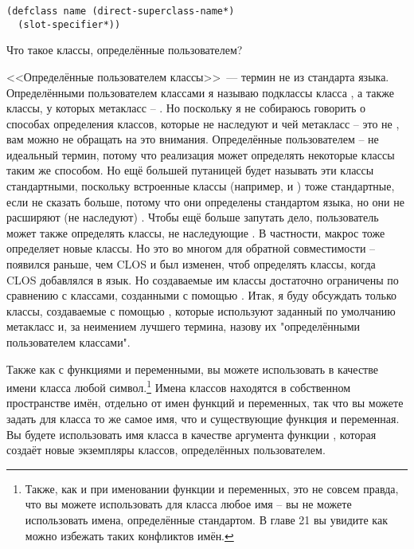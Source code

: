 \begin{lstlisting}
(defclass name (direct-superclass-name*)
  (slot-specifier*))
\end{lstlisting}

Что такое классы, определённые пользователем?

<<Определённые пользователем классы>>~--- термин не из стандарта языка. Определёнными
пользователем классами я называю подклассы класса , а также классы,
у которых метакласс -- . Но поскольку я не собираюсь говорить о
способах определения классов, которые не наследуют  и чей метакласс
-- это не , вам можно не обращать на это внимания. Определённые
пользователем -- не идеальный термин, потому что реализация может определять некоторые
классы таким же способом. Но ещё большей путаницей будет называть эти классы стандартными,
поскольку встроенные классы (например,  и ) тоже стандартные,
если не сказать больше, потому что они определены стандартом языка, но они не расширяют
(не наследуют) . Чтобы ещё больше запутать дело, пользователь может
также определять классы, не наследующие . В частности, макрос
 тоже определяет новые классы. Но это во многом для обратной совместимости
--  появился раньше, чем CLOS и был изменен, чтоб определять классы, когда
CLOS добавлялся в язык. Но создаваемые им классы достаточно ограничены по сравнению с
классами, созданными с помощью . Итак, я буду обсуждать только классы,
создаваемые с помощью , которые используют заданный по умолчанию метакласс
 и, за неимением лучшего термина, назову их "определёнными
пользователем классами".

Также как с функциями и переменными, вы можете использовать в качестве имени класса любой
символ.\footnote{Также, как и при именовании функции и переменных, это не совсем правда,
  что вы можете использовать для класса любое имя -- вы не можете использовать имена,
  определённые стандартом.  В главе 21 вы увидите как можно избежать таких конфликтов
  имён.}  Имена классов находятся в собственном пространстве имён, отдельно от имен
функций и переменных, так что вы можете задать для класса то же самое имя, что и
существующие функция и переменная.  Вы будете использовать имя класса в качестве аргумента
функции , которая создаёт новые экземпляры классов, определённых
пользователем.


